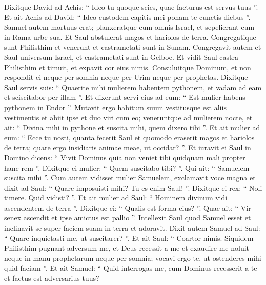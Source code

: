 \begin{biblechapter}
\begin{biblechapter}
\begin{biblechapter}
\begin{biblechapter}
\begin{biblechapter}
\begin{biblechapter}
\begin{biblechapter}
\begin{biblechapter}
\begin{biblechapter}
\begin{biblechapter}
\begin{biblechapter}
\begin{biblechapter}
\begin{biblechapter}
\begin{biblechapter}
\begin{biblechapter}
\begin{biblechapter}
\begin{biblechapter}
\begin{biblechapter}
\begin{biblechapter}
\begin{biblechapter}
\begin{biblechapter}
\begin{biblechapter}
\begin{biblechapter}
\begin{biblechapter}
\begin{biblechapter}
\begin{biblechapter}
\begin{biblechapter}
\begin{biblechapter}
\verse Dixitque David ad Achis: “ Ideo tu quoque scies, quae facturus est servus tuus ”. Et ait Achis ad David: “ Ideo custodem capitis mei ponam te cunctis diebus ”.
 \verse Samuel autem mortuus erat; planxeratque eum omnis Israel, et sepelierant eum in Rama urbe sua. Et Saul abstulerat magos et hariolos de terra.
 \verse Congregatique sunt Philisthim et venerunt et castrametati sunt in Sunam. Congregavit autem et Saul universum Israel, et castrametati sunt in Gelboe. 
 \verse Et vidit Saul castra Philisthim et timuit, et expavit cor eius nimis. 
\verse Consuluitque Dominum, et non respondit ei neque per somnia neque per Urim neque per prophetas.
 \verse Dixitque Saul servis suis: “ Quaerite mihi mulierem habentem pythonem, et vadam ad eam et sciscitabor per illam ”. Et dixerunt servi eius ad eum: “ Est mulier habens pythonem in Endor ”. 
\verse Mutavit ergo habitum suum vestitusque est aliis vestimentis et abiit ipse et duo viri cum eo; veneruntque ad mulierem nocte, et ait: “ Divina mihi in pythone et suscita mihi, quem dixero tibi ”. 
\verse Et ait mulier ad eum: “ Ecce tu nosti, quanta fecerit Saul et quomodo eraserit magos et hariolos de terra; quare ergo insidiaris animae meae, ut occidar? ”. 
\verse Et iuravit ei Saul in Domino dicens: “ Vivit Dominus quia non veniet tibi quidquam mali propter hanc rem ”. 
\verse Dixitque ei mulier: “ Quem suscitabo tibi? ”. Qui ait: “ Samuelem suscita mihi ”.
 \verse Cum autem vidisset mulier Samuelem, exclamavit voce magna et dixit ad Saul: “ Quare imposuisti mihi? Tu es enim Saul! ”. 
\verse Dixitque ei rex: “ Noli timere. Quid vidisti? ”. Et ait mulier ad Saul: “ Hominem divinum vidi ascendentem de terra ”. 
\verse Dixitque ei: “ Qualis est forma eius? ”. Quae ait: “ Vir senex ascendit et ipse amictus est pallio ”. Intellexit Saul quod Samuel esset et inclinavit se super faciem suam in terra et adoravit.
 \verse Dixit autem Samuel ad Saul: “ Quare inquietasti me, ut suscitarer? ”. Et ait Saul: “ Coartor nimis. Siquidem Philisthim pugnant adversum me, et Deus recessit a me et exaudire me noluit neque in manu prophetarum neque per somnia; vocavi ergo te, ut ostenderes mihi quid faciam ”. 
\verse Et ait Samuel: “ Quid interrogas me, cum Dominus recesserit a te et factus est adversarius tuus? 

\end{biblechapter}
\end{biblechapter}
\end{biblechapter}
\end{biblechapter}
\end{biblechapter}
\end{biblechapter}
\end{biblechapter}
\end{biblechapter}
\end{biblechapter}
\end{biblechapter}
\end{biblechapter}
\end{biblechapter}
\end{biblechapter}
\end{biblechapter}
\end{biblechapter}
\end{biblechapter}
\end{biblechapter}
\end{biblechapter}
\end{biblechapter}
\end{biblechapter}
\end{biblechapter}
\end{biblechapter}
\end{biblechapter}
\end{biblechapter}
\end{biblechapter}
\end{biblechapter}
\end{biblechapter}
\end{biblechapter}
